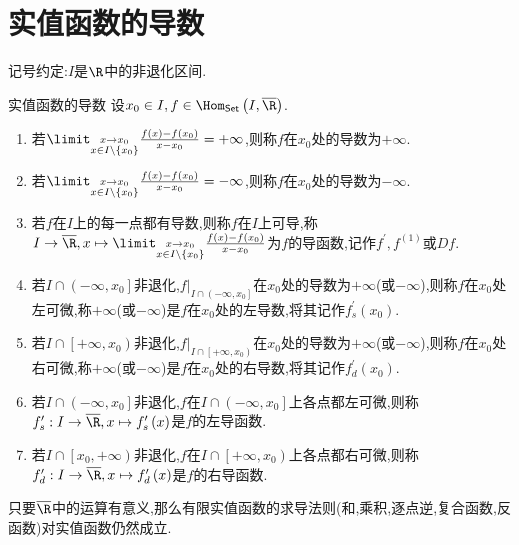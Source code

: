 \section{实值函数的导数}

记号约定:$I$是$\R$中的非退化区间.

\begin{definition}{实值函数的导数}{}
	设$x_{0}\in I,f\in\Hom_{\mathsf{Set}}\left(I,\overline{\R}\right)$.
	\begin{enumerate}
		\item 若$\limit_{\substack{x\to x_{0}\\ x\in I\setminus\left\{x_{0}\right\}}}\frac{f\left(x\right)-f\left(x_{0}\right)}{x-x_{0}}=+\infty$,则称$f$在$x_{0}$处的导数为$+\infty$.
		\item 若$\limit_{\substack{x\to x_{0}\\ x\in I\setminus\left\{x_{0}\right\}}}\frac{f\left(x\right)-f\left(x_{0}\right)}{x-x_{0}}=-\infty$,则称$f$在$x_{0}$处的导数为$-\infty$.
		\item 若$f$在$I$上的每一点都有导数,则称$f$在$I$上可导,称$I\to\overline{\R},x\mapsto\limit_{\substack{x\to x_{0}\\ x\in I\setminus\left\{x_{0}\right\}}}\frac{f\left(x\right)-f\left(x_{0}\right)}{x-x_{0}}$为$f$的导函数,记作$f^{\prime},f^{\left(1\right)}$或$Df$.
		\item 若$I\cap\left(-\infty,x_{0}\right]$非退化,$f|_{I\cap\left(-\infty,x_{0}\right]}$在$x_{0}$处的导数为$+\infty$(或$-\infty$),则称$f$在$x_{0}$处左可微,称$+\infty$(或$-\infty$)是$f$在$x_{0}$处的左导数,将其记作$f_{s}^{\prime}\left(x_{0}\right)$.
		\item 若$I\cap\left[+\infty,x_{0}\right)$非退化,$f|_{I\cap\left[+\infty,x_{0}\right)}$在$x_{0}$处的导数为$+\infty$(或$-\infty$),则称$f$在$x_{0}$处右可微,称$+\infty$(或$-\infty$)是$f$在$x_{0}$处的右导数,将其记作$f_{d}^{\prime}\left(x_{0}\right)$.
		\item 若$I\cap\left(-\infty,x_{0}\right]$非退化,$f$在$I\cap\left(-\infty,x_{0}\right]$上各点都左可微,则称$f_{s}^{\prime}:I\to\overline{\R},x\mapsto f_{s}^{\prime}\left(x\right)$是$f$的左导函数.
		\item 若$I\cap\left[x_{0},+\infty\right)$非退化,$f$在$I\cap\left[+\infty,x_{0}\right)$上各点都右可微,则称$f_{d}^{\prime}:I\to\overline{\R},x\mapsto f_{d}^{\prime}\left(x\right)$是$f$的右导函数.
	\end{enumerate}
\end{definition}

\begin{remark}{}{}
	只要$\overline{\R}$中的运算有意义,那么有限实值函数的求导法则(和,乘积,逐点逆,复合函数,反函数)对实值函数仍然成立.
\end{remark}

